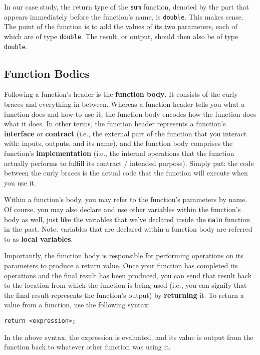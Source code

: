 \documentclass{article}
\begin{document}
In our case study, the return type of the \texttt{sum} function, denoted by the part that appears immediately before the function's name, is \texttt{double}. This makes sense. The point of the function is to add the values of its two parameters, each of which are of type \texttt{double}. The result, or output, should then also be of type \texttt{double}.

\subsection{Function Bodies}

Following a function's header is the \textbf{function body}. It consists of the curly braces and everything in between. Whereas a function header tells you what a function does and how to use it, the function body encodes how the function does what it does. In other terms, the function header represents a function's \textbf{interface} or \textbf{contract} (i.e., the external part of the function that you interact with: inputs, outputs, and its name), and the function body comprises the function's \textbf{implementation} (i.e., the internal operations that the function actually performs to fulfill its contract / intended purpose). Simply put: the code between the curly braces is the actual code that the function will execute when you use it.

Within a function's body, you may refer to the function's parameters by name. Of course, you may also declare and use other variables within the function's body as well, just like the variables that we've declared inside the \texttt{main} function in the past. Note: variables that are declared within a function body are referred to as \textbf{local variables}.

Importantly, the function body is responsible for performing operations on its parameters to produce a return value. Once your function has completed its operations and the final result has been produced, you can send that result back to the location from which the function is being used (i.e., you can signify that the final result represents the function's output) by \textbf{returning} it. To return a value from a function, use the following syntax:

\begin{verbatim}
return <expression>;
\end{verbatim}

In the above syntax, the expression is evaluated, and its value is output from the function back to whatever other function was using it.
\end{document}

